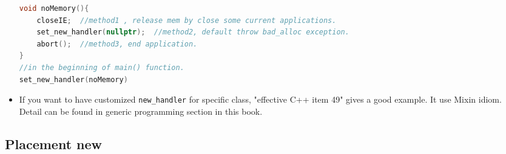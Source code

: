 \documentclass[a4paper,11pt,twoside]{book}
\begin{document}
\begin{itemize}
\begin{lstlisting}[frame=single, language=c++]
void noMemory(){
	closeIE;  //method1 , release mem by close some current applications.
	set_new_handler(nullptr);  //method2, default throw bad_alloc exception.
	abort();  //method3, end application.
}
//in the beginning of main() function.
set_new_handler(noMemory)
\end{lstlisting}
	

	\item If you want to have customized \texttt{new\_handler} for specific class, "effective C++ item 49" gives a good example. It use Mixin idiom. Detail can be found in generic programming section in this book.
\end{itemize}

\subsection{Placement new}
\end{document}
